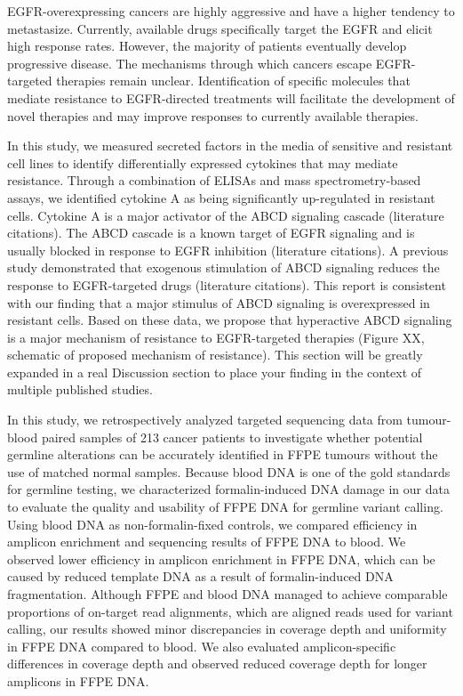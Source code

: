 EGFR-overexpressing cancers are highly aggressive and have a higher tendency to metastasize. Currently, available drugs specifically target the EGFR and elicit high response rates. However, the majority of patients eventually develop progressive disease. The mechanisms through which cancers escape EGFR-targeted therapies remain unclear. Identification of specific molecules that mediate resistance to EGFR-directed treatments will facilitate the development of novel therapies and may improve responses to currently available therapies.

In this study, we measured secreted factors in the media of sensitive and resistant cell lines to identify differentially expressed cytokines that may mediate resistance. Through a combination of ELISAs and mass spectrometry-based assays, we identified cytokine A as being significantly up-regulated in resistant cells. Cytokine A is a major activator of the ABCD signaling cascade (literature citations). The ABCD cascade is a known target of EGFR signaling and is usually blocked in response to EGFR inhibition (literature citations). A previous study demonstrated that exogenous stimulation of ABCD signaling reduces the response to EGFR-targeted drugs (literature citations). This report is consistent with our finding that a major stimulus of ABCD signaling is overexpressed in resistant cells. Based on these data, we propose that hyperactive ABCD signaling is a major mechanism of resistance to EGFR-targeted therapies (Figure XX, schematic of proposed mechanism of resistance). This section will be greatly expanded in a real Discussion section to place your finding in the context of multiple published studies.

In this study, we retrospectively analyzed targeted sequencing data from tumour-blood paired samples of 213 cancer patients to investigate whether potential germline alterations can be accurately identified in FFPE tumours without the use of matched normal samples. Because blood DNA is one of the gold standards for germline testing, we characterized formalin-induced DNA damage in our data to evaluate the quality and usability of FFPE DNA for germline variant calling. Using blood DNA as non-formalin-fixed controls, we compared efficiency in amplicon enrichment and sequencing results of FFPE DNA to blood. We observed lower efficiency in amplicon enrichment in FFPE DNA, which can be caused by reduced template DNA as a result of formalin-induced DNA fragmentation. Although FFPE and blood DNA managed to achieve comparable proportions of on-target read alignments, which are aligned reads used for variant calling, our results showed minor discrepancies in coverage depth and uniformity in FFPE DNA compared to blood. We also evaluated amplicon-specific differences in coverage depth and observed reduced coverage depth for longer amplicons in FFPE DNA.


